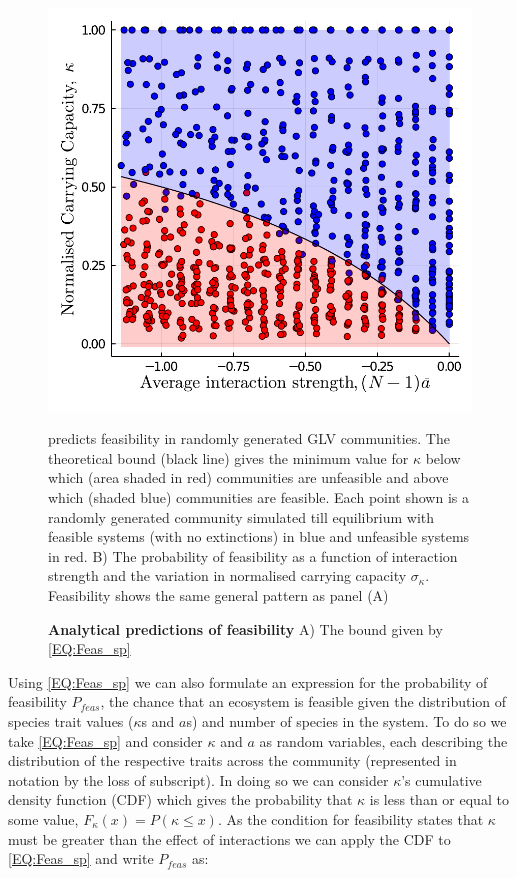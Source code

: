 \documentclass{article}
\begin{document}
\begin{figure}[h] 
    \centering
    \includegraphics[width = \textwidth]{docs/Figures/Fig_1.pdf}
    \caption[width = 0.1\textwidth]{\textbf{Analytical predictions of feasibility} A) The bound given by \cref{EQ:Feas_sp}} predicts feasibility in randomly generated GLV communities. The theoretical bound (black line) gives the minimum value for $\kappa$ below which (area shaded in red) communities are unfeasible and above which (shaded blue) communities are feasible. Each point shown is a randomly generated community simulated till equilibrium with feasible systems (with no extinctions) in blue and unfeasible systems in red. B) The probability of feasibility as a function of interaction strength and the variation in normalised carrying capacity $\sigma_{\kappa}$. Feasibility shows the same general pattern as panel (A) 
    \label{Fig:Feasability_Bound}
\end{figure}

Using \cref{EQ:Feas_sp} we can also formulate an expression for the probability of feasibility $P_{feas}$, the chance that an ecosystem is feasible given the distribution of species trait values ($\kappa$s and $a$s) and number of species in the system. To do so we take \cref{EQ:Feas_sp} and consider $\kappa$ and $a$ as random variables, each describing the distribution of the respective traits across the community (represented in notation by the loss of subscript). In doing so we can consider $\kappa$'s cumulative density function (CDF) which gives the probability that $\kappa$ is less than or equal to some value, $F_{\kappa}(x) = P(\kappa \leq x)$. As the condition for feasibility states that $\kappa$ must be greater than the effect of interactions we can apply the CDF to \cref{EQ:Feas_sp} and write $P_{feas}$ as:
\end{document}
